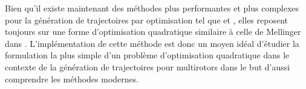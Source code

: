 Bien qu'il existe maintenant des méthodes plus performantes et plus complexes pour la génération de trajectoires par optimisation tel que \cite{Richter2016} et \cite{Chen2016}, elles reposent toujours sur une forme d'optimisation quadratique similaire à celle de Mellinger dans \cite{Mellinger2011}. L'implémentation de cette méthode est donc un moyen idéal d'étudier la formulation la plus simple d'un problème d'optimisation quadratique dans le contexte de la génération de trajectoires pour multirotors dans le but d'aussi comprendre les méthodes modernes.